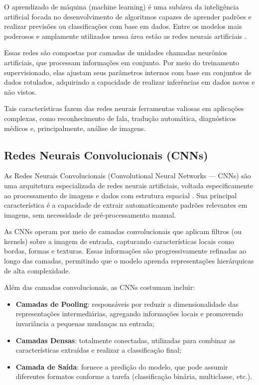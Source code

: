 O aprendizado de máquina (machine learning) é uma subárea da
inteligência artificial focada no desenvolvimento de algoritmos
capazes de aprender padrões e realizar previsões ou classificações
com base em dados. Entre os modelos mais poderosos e amplamente
utilizados nessa área estão as redes neurais artificiais
\cite{goodfellow2016deep}.

Essas redes são compostas por camadas de unidades chamadas neurônios
artificiais, que processam informações em conjunto. Por meio do
treinamento supervisionado, elas ajustam seus parâmetros internos
com base em conjuntos de dados rotulados, adquirindo a capacidade
de realizar inferências em dados novos e não vistos.

Tais características fazem das redes neurais ferramentas valiosas
em aplicações complexas, como reconhecimento de fala, tradução
automática, diagnósticos médicos e, principalmente, análise de imagens.

\subsection{Redes Neurais Convolucionais (CNNs)}

As Redes Neurais Convolucionais (Convolutional Neural Networks —
CNNs) são uma arquitetura especializada de redes neurais artificiais,
voltada especificamente ao processamento de imagens e dados com
estrutura espacial \cite{lecun1998gradient}. Sua principal
característica é a capacidade de extrair automaticamente padrões
relevantes em imagens, sem necessidade de pré-processamento manual.

As CNNs operam por meio de camadas convolucionais que aplicam
filtros (ou kernels) sobre a imagem de entrada, capturando
características locais como bordas, formas e texturas. Essas
informações são progressivamente refinadas ao longo das camadas,
permitindo que o modelo aprenda representações hierárquicas de
alta complexidade.

Além das camadas convolucionais, as CNNs costumam incluir:
\begin{itemize}
\item \textbf{Camadas de Pooling}: responsáveis por reduzir a
dimensionalidade das representações intermediárias,
agregando informações locais e promovendo invariância a
pequenas mudanças na entrada;
\item \textbf{Camadas Densas}: totalmente conectadas, utilizadas
para combinar as características extraídas e realizar a
classificação final;
\item \textbf{Camada de Saída}: fornece a predição do modelo, que
pode assumir diferentes formatos conforme a tarefa
(classificação binária, multiclasse, etc.).
\end{itemize}

